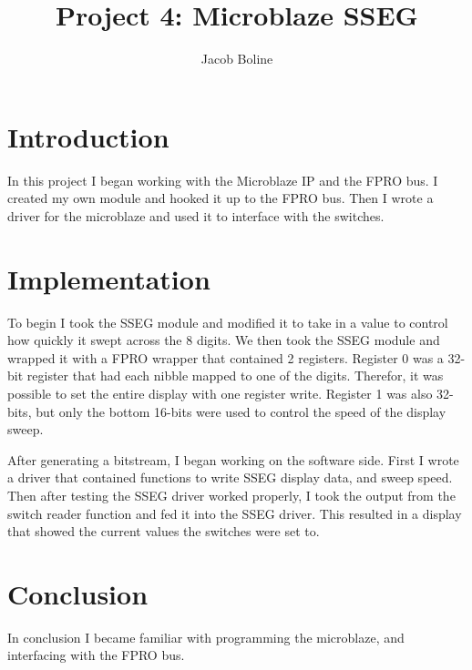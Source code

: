 \documentclass[11pt]{article}
\title{Project 4: Microblaze SSEG}
\author{Jacob Boline}
\begin{document}
\maketitle

\section{Introduction}
In this project I began working with the Microblaze IP and the FPRO bus. I created my own module and hooked it up to the FPRO bus. Then I wrote a driver for the microblaze and used it to interface with the switches.

\section{Implementation}
To begin I took the SSEG module and modified it to take in a value to control how quickly it swept across the 8 digits. We then took the SSEG module and wrapped it with a FPRO wrapper that contained 2 registers. Register 0 was a 32-bit register that had each nibble mapped to one of the digits. Therefor, it was possible to set the entire display with one register write. Register 1 was also 32-bits, but only the bottom 16-bits were used to control the speed of the display sweep.

After generating a bitstream, I began working on the software side. First I wrote a driver that contained functions to write SSEG display data, and sweep speed. Then after testing the SSEG driver worked properly, I took the output from the switch reader function and fed it into the SSEG driver. This resulted in a display that showed the current values the switches were set to.

\section{Conclusion}
In conclusion I became familiar with programming the microblaze, and interfacing with the FPRO bus.
\end{document}
